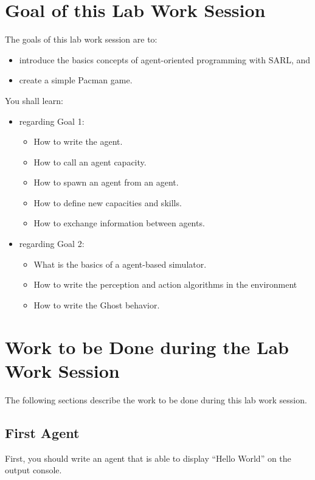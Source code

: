 \documentclass[article,english,nodocumentinfo]{multiagentfrreport}
\begin{document}
\section{Goal of this Lab Work Session}

The goals of this lab work session are to:
\begin{itemize}
\item introduce the basics concepts of agent-oriented programming with SARL, and
\item create a simple Pacman game.
\end{itemize}

You shall learn: 
\begin{itemize}
\item regarding Goal 1:
	\begin{itemize}
	\item How to write the agent.
	\item How to call an agent capacity.
	\item How to spawn an agent from an agent.
	\item How to define new capacities and skills.
	\item How to exchange information between agents.
	\end{itemize}
\item regarding Goal 2:
	\begin{itemize}
	\item What is the basics of a agent-based simulator.
	\item How to write the perception and action algorithms in the environment
	\item How to write the Ghost behavior.
	\end{itemize}
\end{itemize}



\section{Work to be Done during the Lab Work Session}

The following sections describe the work to be done during this lab work session.

\subsection{First Agent}

First, you should write an agent that is able to display ``Hello World'' on the output console.
\end{document}

